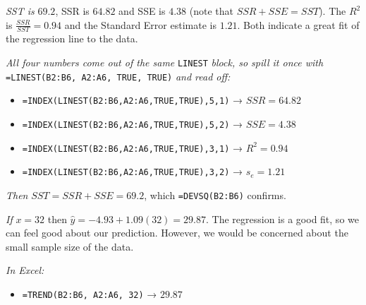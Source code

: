 \documentclass[
  11pt,
  letterpaper,
  DIV=11,
  numbers=noendperiod,
  oneside,
  open=any]{scrreprt}
\providecommand{\tightlist}{%
  \setlength{\itemsep}{0pt}\setlength{\parskip}{0pt}}\usepackage{longtable,booktabs,array}
\newenvironment{bsanswerkey}[2]{%
  \begin{tcolorbox}[bsbase, colback=bspaper2, colframe=bsline, fontupper=\small,
    title={\hypertarget{a-#1}{}\label{a-#1}\hyperlink{q-#1}{\textcolor{bsink2}{\MakeUppercase{#2}}}\hfill
      \hyperlink{q-#1}{\textcolor{bsaccent}{\normalfont\footnotesize back to page \pageref{q-#1}}}}]}%
  {\end{tcolorbox}}
\begin{document}
\begin{bsanswerkey}{bsans60}{Exercise 1, question 2}

\emph{SST is} \(69.2\), SSR is \(64.82\) and SSE is \(4.38\) (note that
\(SSR+SSE=SST\)). The \(R^2\) is \(\frac{SSR}{SST}=0.94\) and the
Standard Error estimate is \(1.21\). Both indicate a great fit of the
regression line to the data.

\emph{All four numbers come out of the same} \texttt{LINEST}
\emph{block, so spill it once with}
\texttt{=LINEST(B2:B6,\ A2:A6,\ TRUE,\ TRUE)} \emph{and read off:}

\begin{itemize}
\tightlist
\item
  \texttt{=INDEX(LINEST(B2:B6,A2:A6,TRUE,TRUE),5,1)} → \(SSR = 64.82\)
\item
  \texttt{=INDEX(LINEST(B2:B6,A2:A6,TRUE,TRUE),5,2)} → \(SSE = 4.38\)
\item
  \texttt{=INDEX(LINEST(B2:B6,A2:A6,TRUE,TRUE),3,1)} → \(R^2 = 0.94\)
\item
  \texttt{=INDEX(LINEST(B2:B6,A2:A6,TRUE,TRUE),3,2)} → \(s_e = 1.21\)
\end{itemize}

\emph{Then} \(SST = SSR + SSE = 69.2\), which \texttt{=DEVSQ(B2:B6)}
confirms.

\end{bsanswerkey}

\begin{bsanswerkey}{bsans61}{Exercise 1, question 3}

\emph{If} \(x=32\) then \(\hat{y}=-4.93+1.09(32)=29.87\). The regression
is a good fit, so we can feel good about our prediction. However, we
would be concerned about the small sample size of the data.

\emph{In Excel:}

\begin{itemize}
\tightlist
\item
  \texttt{=TREND(B2:B6,\ A2:A6,\ 32)} → \(29.87\)
\end{itemize}

\end{bsanswerkey}
\end{document}
